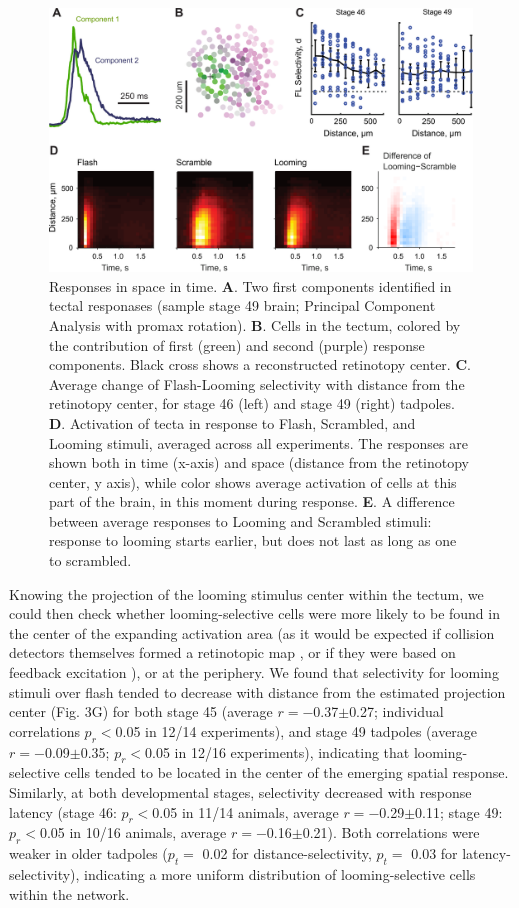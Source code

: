 \documentclass{article}
\begin{document}
\begin{figure}[t]
\includegraphics[width=\linewidth]{fig3.pdf}
\caption{
Responses in space in time. \textbf{A}. Two first components identified in tectal responases (sample stage 49 brain; Principal Component Analysis with promax rotation).  \textbf{B}. Cells in the tectum, colored by the contribution of first (green) and second (purple) response components. Black cross shows a reconstructed retinotopy center. \textbf{C}. Average change of Flash-Looming selectivity with distance from the retinotopy center, for stage 46 (left) and stage 49 (right) tadpoles. \textbf{D}. Activation of tecta in response to Flash, Scrambled, and Looming stimuli, averaged across all experiments. The responses are shown both in time (x-axis) and space (distance from the retinotopy center, y axis), while color shows average activation of cells at this part of the brain, in this moment during response. \textbf{E}. A difference between average responses to Looming and Scrambled stimuli: response to looming starts earlier, but does not last as long as one to scrambled.}
\end{figure}

Knowing the projection of the looming stimulus center within the tectum, we could then check whether looming-selective cells were more likely to be found in the center of the expanding activation area (as it would be expected if collision detectors themselves formed a retinotopic map \citep{frost2004review}, or if they were based on feedback excitation \citep{jang2016}), or at the periphery. We found that selectivity for looming stimuli over flash tended to decrease with distance from the estimated projection center (Fig. 3G) for both stage 45 (average $r=-$0.37$\pm$0.27; individual correlations $p_r<$0.05 in 12/14 experiments), and stage 49 tadpoles (average $r=-$0.09$\pm$0.35; $p_r<$0.05 in 12/16 experiments), indicating that looming-selective cells tended to be located in the center of the emerging spatial response. Similarly, at both developmental stages, selectivity decreased with response latency (stage 46: $p_r<$0.05 in 11/14 animals, average $r=-$0.29$\pm$0.11; stage 49: $p_r<$0.05 in 10/16 animals, average $r=-$0.16$\pm$0.21). Both correlations were weaker in older tadpoles ($p_t=$ 0.02 for distance-selectivity, $p_t=$ 0.03 for latency-selectivity), indicating a more uniform distribution of looming-selective cells within the network.
\end{document}
